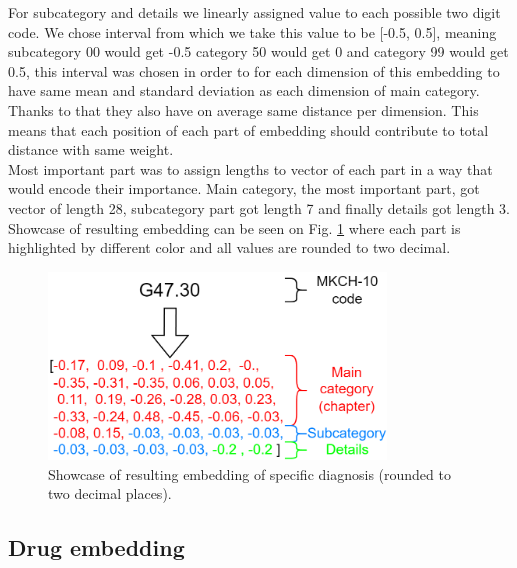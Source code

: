 For subcategory and details we linearly assigned value to each possible two digit code. We chose interval from which we take this value to be [-0.5, 0.5], meaning subcategory 00 would get -0.5 category 50 would get 0 and category 99 would get 0.5, this interval was chosen in order to for each dimension of this embedding to have same mean and standard deviation as each dimension of main category. Thanks to that they also have on average same distance per dimension. This means that each position of each part of embedding should contribute to total distance with same weight.
\\

Most important part was to assign lengths to vector of each part in a way that would encode their importance. 
Main category, the most important part, got vector of length 28, subcategory part got length 7 and finally details got length 3.
\\

Showcase of resulting embedding can be seen on Fig. \ref{fig:diag_emb_show} where each part is highlighted by different color and all values are rounded to two decimal.

\begin{figure}[!h]
	\centering
	
	\includegraphics[width=0.8\textwidth]{images/diagnosis_embed_showcase.png} 
	
	\caption{Showcase of resulting embedding of specific diagnosis (rounded to two decimal places).}
	\label{fig:diag_emb_show}
\end{figure} 


\subsection{Drug embedding}

